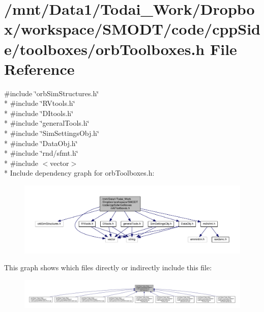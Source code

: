 \section{/mnt/\-Data1/\-Todai\-\_\-\-Work/\-Dropbox/workspace/\-S\-M\-O\-D\-T/code/cpp\-Side/toolboxes/orb\-Toolboxes.h File Reference}
\label{orb_toolboxes_8h}
{\ttfamily \#include \char`\"{}orb\-Sim\-Structures.\-h\char`\"{}}\\*
{\ttfamily \#include \char`\"{}R\-Vtools.\-h\char`\"{}}\\*
{\ttfamily \#include \char`\"{}D\-Itools.\-h\char`\"{}}\\*
{\ttfamily \#include \char`\"{}general\-Tools.\-h\char`\"{}}\\*
{\ttfamily \#include \char`\"{}Sim\-Settings\-Obj.\-h\char`\"{}}\\*
{\ttfamily \#include \char`\"{}Data\-Obj.\-h\char`\"{}}\\*
{\ttfamily \#include \char`\"{}rnd/sfmt.\-h\char`\"{}}\\*
{\ttfamily \#include $<$vector$>$}\\*
Include dependency graph for orb\-Toolboxes.\-h\-:\nopagebreak
\begin{figure}[H]
\begin{center}
\leavevmode
\includegraphics[width=350pt]{orb_toolboxes_8h__incl}
\end{center}
\end{figure}
This graph shows which files directly or indirectly include this file\-:\nopagebreak
\begin{figure}[H]
\begin{center}
\leavevmode
\includegraphics[width=350pt]{orb_toolboxes_8h__dep__incl}
\end{center}
\end{figure}
